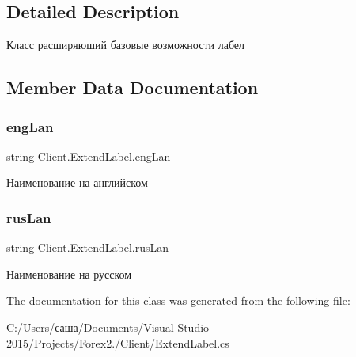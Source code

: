 \subsection{Detailed Description}
Класс расширяюший базовые возможности лабел 



\subsection{Member Data Documentation}
\hypertarget{class_client_1_1_extend_label_a75adae5701c1a1a81f6dca5928d171c2}{}\label{class_client_1_1_extend_label_a75adae5701c1a1a81f6dca5928d171c2} 
\subsubsection{\texorpdfstring{eng\+Lan}{engLan}}
{\footnotesize\ttfamily string Client.\+Extend\+Label.\+eng\+Lan}



Наименование на английском 

\hypertarget{class_client_1_1_extend_label_a77d9ce34371d09953d0fd6423abbc6c6}{}\label{class_client_1_1_extend_label_a77d9ce34371d09953d0fd6423abbc6c6} 
\subsubsection{\texorpdfstring{rus\+Lan}{rusLan}}
{\footnotesize\ttfamily string Client.\+Extend\+Label.\+rus\+Lan}



Наименование на русском 



The documentation for this class was generated from the following file\+:\begin{DoxyCompactItemize}
\item 
C\+:/\+Users/саша/\+Documents/\+Visual Studio 2015/\+Projects/\+Forex2./\+Client/Extend\+Label.\+cs\end{DoxyCompactItemize}
